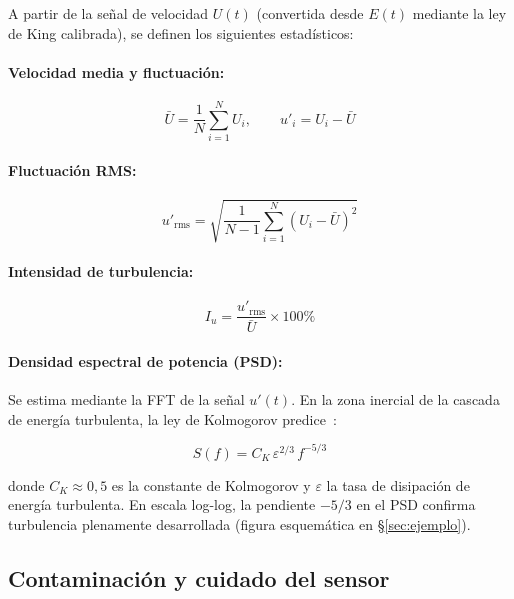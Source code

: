\documentclass[12pt,a4paper]{article}
\begin{document}
A partir de la señal de velocidad $U(t)$ (convertida desde $E(t)$ mediante
la ley de King calibrada), se definen los siguientes estadísticos:

\paragraph{Velocidad media y fluctuación:}
\begin{equation}
	\bar{U} = \frac{1}{N}\sum_{i=1}^{N} U_i, \qquad
	u'_i = U_i - \bar{U}
	\label{eq:U_mean}
\end{equation}

\paragraph{Fluctuación RMS:}
\begin{equation}
	u'_\mathrm{rms} = \sqrt{\frac{1}{N-1}\sum_{i=1}^{N}(U_i - \bar{U})^2}
	\label{eq:urms}
\end{equation}

\paragraph{Intensidad de turbulencia:}
\begin{equation}
	I_u = \frac{u'_\mathrm{rms}}{\bar{U}} \times 100\%
	\label{eq:Iu}
\end{equation}

\paragraph{Densidad espectral de potencia (PSD):}  Se estima mediante la
FFT de la señal $u'(t)$.  En la zona inercial de la cascada de energía
turbulenta, la ley de Kolmogorov predice~\cite{kolmogorov1941}:

\begin{equation}
	S(f) = C_K\,\varepsilon^{2/3}\,f^{-5/3}
	\label{eq:kolmogorov}
\end{equation}

donde $C_K \approx 0{,}5$ es la constante de Kolmogorov y $\varepsilon$ la
tasa de disipación de energía turbulenta.  En escala log-log, la pendiente
$-5/3$ en el PSD confirma turbulencia plenamente desarrollada (figura
esquemática en §\ref{sec:ejemplo}).

\subsection{Contaminación y cuidado del sensor}
\label{subsec:contaminacion}
\end{document}
